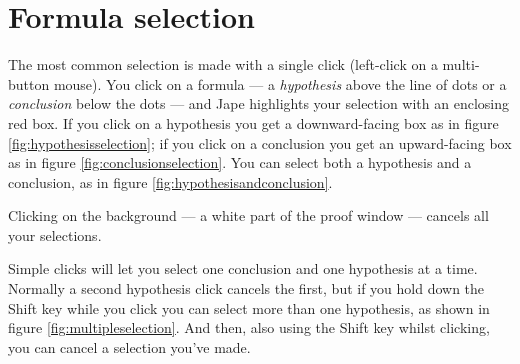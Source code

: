 \documentclass[11pt]{book}
\newcommand{\figref}[1]{figure \ref{fig:#1}}
\begin{document}
\section{Formula selection}
\label{sec:formulaselection}

The most common selection is made with a single click (left-click on a multi-button mouse). You click on a formula --- a \emph{hypothesis} above the line of dots or a \emph{conclusion} below the dots --- and Jape highlights your selection with an enclosing red box. If you click on a hypothesis you get a downward-facing box as in \figref{hypothesisselection}; if you click on a conclusion you get an upward-facing box as in \figref{conclusionselection}. You can select both a hypothesis and a conclusion, as in \figref{hypothesisandconclusion}.

Clicking on the background --- a white part of the proof window --- cancels all your selections.

Simple clicks will let you select one conclusion and one hypothesis at a time. Normally a second hypothesis click cancels the first, but if you hold down the Shift key while you click you can select more than one hypothesis, as shown in \figref{multipleselection}. And then, also using the Shift key whilst clicking, you can cancel a selection you've made.
\end{document}
